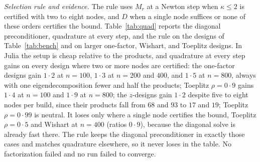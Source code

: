 \documentclass[11pt]{article}
\begin{document}
\emph{Selection rule and evidence.} The rule uses $M_r$ at a Newton
step when $\kappa\leq2$ is certified with two to eight nodes, and $D$
when a single node suffices or none of these orders certifies the
bound. Table~\ref{tab:quad} reports the diagonal
preconditioner, quadrature at every step, and the rule on the designs
of Table~\ref{tab:bench} and on larger one-factor, Wishart, and
Toeplitz designs. In Julia the setup is cheap relative to the products, and quadrature
at every step gains on every design where two or more nodes are
certified: the one-factor designs gain $1{\cdot}2$ at $n=100$,
$1{\cdot}3$ at $n=200$ and $400$, and $1{\cdot}5$ at $n=800$, always
with one eigendecomposition fewer and half the products; Toeplitz
$\rho=0{\cdot}9$ gains $1{\cdot}4$ at $n=100$ and $1{\cdot}9$ at
$n=800$; the $z$-designs gain $1{\cdot}2$ despite five to eight nodes
per build, since their products fall from $68$ and $93$ to $17$ and
$19$; Toeplitz $\rho=0{\cdot}99$ is neutral. It loses only where a
single node certifies the bound, Toeplitz $\rho=0{\cdot}5$ and Wishart
at $n=400$ (ratios $0{\cdot}9$), because the diagonal solve is
already fast there. The rule keeps the diagonal preconditioner in
exactly those cases and matches quadrature elsewhere, so it never
loses in the table. No factorization failed and no run failed to
converge.
\end{document}
